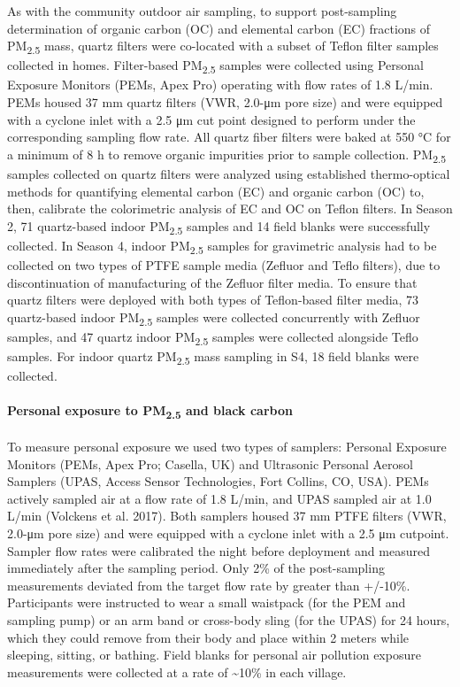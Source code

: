 \documentclass[
  letterpaper,
  DIV=11,
  numbers=noendperiod]{scrartcl}
\let\oldparagraph\paragraph
\renewcommand{\paragraph}[1]{\oldparagraph{#1}\mbox{}}
\begin{document}
As with the community outdoor air sampling, to support post-sampling
determination of organic carbon (OC) and elemental carbon (EC) fractions
of PM\textsubscript{2.5} mass, quartz filters were co-located with a
subset of Teflon filter samples collected in homes. Filter-based
PM\textsubscript{2.5} samples were collected using Personal Exposure
Monitors (PEMs, Apex Pro) operating with flow rates of 1.8 L/min. PEMs
housed 37 mm quartz filters (VWR, 2.0-μm pore size) and were equipped
with a cyclone inlet with a 2.5 μm cut point designed to perform under
the corresponding sampling flow rate. All quartz fiber filters were
baked at 550 °C for a minimum of 8 h to remove organic impurities prior
to sample collection. PM\textsubscript{2.5} samples collected on quartz
filters were analyzed using established thermo-optical methods for
quantifying elemental carbon (EC) and organic carbon (OC) to, then,
calibrate the colorimetric analysis of EC and OC on Teflon filters. In
Season 2, 71 quartz-based indoor PM\textsubscript{2.5} samples and 14
field blanks were successfully collected. In Season 4, indoor
PM\textsubscript{2.5} samples for gravimetric analysis had to be
collected on two types of PTFE sample media (Zefluor and Teflo filters),
due to discontinuation of manufacturing of the Zefluor filter media. To
ensure that quartz filters were deployed with both types of Teflon-based
filter media, 73 quartz-based indoor PM\textsubscript{2.5} samples were
collected concurrently with Zefluor samples, and 47 quartz indoor
PM\textsubscript{2.5} samples were collected alongside Teflo samples.
For indoor quartz PM\textsubscript{2.5} mass sampling in S4, 18 field
blanks were collected.

\hypertarget{personal-exposure-to-pm2.5-and-black-carbon}{%
\paragraph{\texorpdfstring{Personal exposure to PM\textsubscript{2.5}
and black
carbon}{Personal exposure to PM2.5 and black carbon}}\label{personal-exposure-to-pm2.5-and-black-carbon}}

To measure personal exposure we used two types of samplers: Personal
Exposure Monitors (PEMs, Apex Pro; Casella, UK) and Ultrasonic Personal
Aerosol Samplers (UPAS, Access Sensor Technologies, Fort Collins, CO,
USA). PEMs actively sampled air at a flow rate of 1.8 L/min, and UPAS
sampled air at 1.0 L/min (Volckens et al. 2017). Both samplers housed 37
mm PTFE filters (VWR, 2.0-μm pore size) and were equipped with a cyclone
inlet with a 2.5 μm cutpoint. Sampler flow rates were calibrated the
night before deployment and measured immediately after the sampling
period. Only 2\% of the post-sampling measurements deviated from the
target flow rate by greater than +/-10\%. Participants were instructed
to wear a small waistpack (for the PEM and sampling pump) or an arm band
or cross-body sling (for the UPAS) for 24 hours, which they could remove
from their body and place within 2 meters while sleeping, sitting, or
bathing. Field blanks for personal air pollution exposure measurements
were collected at a rate of \textasciitilde10\% in each village.
\end{document}
